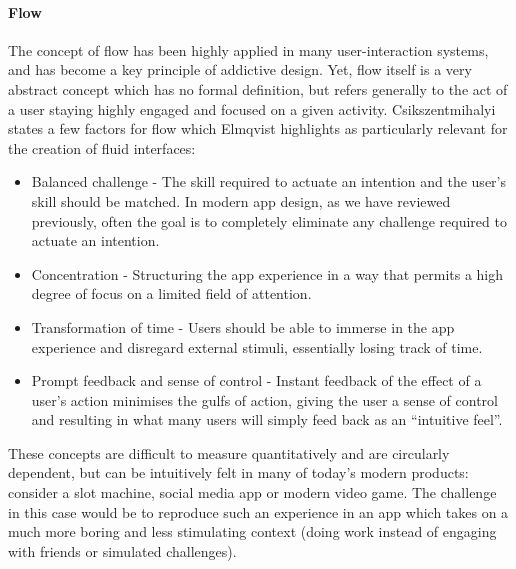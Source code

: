 \paragraph{Flow} The concept of flow has been highly applied in many user-interaction systems, and has become a key principle of addictive design. Yet, flow itself is a very abstract concept which has no formal definition, but refers generally to the act of a user staying highly engaged and focused on a given activity. Csikszentmihalyi \cite{csikszentmihalyi1990flow} states a few factors for flow which Elmqvist \cite{elmqvist2011fluid} highlights as particularly relevant for the creation of fluid interfaces:

\begin{itemize}
    \item Balanced challenge - The skill required to actuate an intention and the user's skill should be matched. In modern app design, as we have reviewed previously, often the goal is to completely eliminate any challenge required to actuate an intention.
    \item Concentration - Structuring the app experience in a way that permits a high degree of focus on a limited field of attention.
    \item Transformation of time - Users should be able to immerse in the app experience and disregard external stimuli, essentially losing track of time.
    \item Prompt feedback and sense of control - Instant feedback of the effect of a user's action minimises the gulfs of action, giving the user a sense of control and resulting in what many users will simply feed back as an ``intuitive feel''.
\end{itemize}

These concepts are difficult to measure quantitatively and are circularly dependent, but can be intuitively felt in many of today's modern products: consider a slot machine, social media app or modern video game. The challenge in this case would be to reproduce such an experience in an app which takes on a much more boring and less stimulating context (doing work instead of engaging with friends or simulated challenges).

